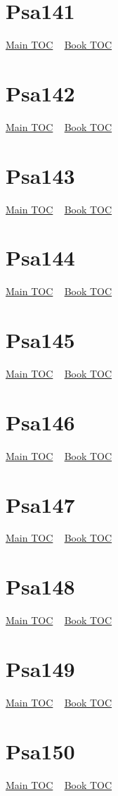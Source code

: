 \documentclass{book}
\begin{document}
  \section{Psa141}\hyperlink{toc}{Main TOC} ~ \hyperref[subsec:Psa]{Book TOC} 
  \section{Psa142}\hyperlink{toc}{Main TOC} ~ \hyperref[subsec:Psa]{Book TOC} 
  \section{Psa143}\hyperlink{toc}{Main TOC} ~ \hyperref[subsec:Psa]{Book TOC} 
  \section{Psa144}\hyperlink{toc}{Main TOC} ~ \hyperref[subsec:Psa]{Book TOC} 
  \section{Psa145}\hyperlink{toc}{Main TOC} ~ \hyperref[subsec:Psa]{Book TOC} 
  \section{Psa146}\hyperlink{toc}{Main TOC} ~ \hyperref[subsec:Psa]{Book TOC} 
  \section{Psa147}\hyperlink{toc}{Main TOC} ~ \hyperref[subsec:Psa]{Book TOC} 
  \section{Psa148}\hyperlink{toc}{Main TOC} ~ \hyperref[subsec:Psa]{Book TOC} 
  \section{Psa149}\hyperlink{toc}{Main TOC} ~ \hyperref[subsec:Psa]{Book TOC} 
  \section{Psa150}\hyperlink{toc}{Main TOC} ~ \hyperref[subsec:Psa]{Book TOC} 
\end{document}
